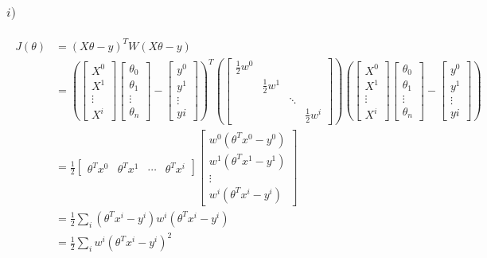\documentclass[11pt]{article}
\begin{document}
\subsubsection*{$i)$ }
\begin{align}
	\begin{split}
		J(\theta) &= (X\theta-y)^TW(X\theta-y) \\
							&= (\begin{bmatrix} X^{0} \\ X^{1} \\ \vdots \\ X^{i} \end{bmatrix}
								\begin{bmatrix} \theta_0 \\ \theta_1 \\ \vdots \\ \theta_n \end{bmatrix} -
									\begin{bmatrix} y^{0} \\ y^{1} \\ \vdots \\ y{i} \end{bmatrix})^T
								 (\begin{bmatrix} \frac{1}{2}w^{0} \\ & \frac{1}{2}w^{1} \\ & & \ddots \\ & & & \frac{1}{2}w^{i} \end{bmatrix})
								 (\begin{bmatrix} X^{0} \\ X^{1} \\ \vdots \\ X^{i} \end{bmatrix}
								  \begin{bmatrix} \theta_0 \\ \theta_1 \\ \vdots \\ \theta_n \end{bmatrix} -
									\begin{bmatrix} y^{0} \\ y^{1} \\ \vdots \\ y{i} \end{bmatrix}) \\
							&= \frac{1}{2} \begin{bmatrix} \theta^{T}x^{0} & \theta^{T}x^{1} & \cdots & \theta^{T}x^{i} \end{bmatrix} 
								 \begin{bmatrix} w^{0}(\theta^Tx^{0}-y^{0}) \\ w^{1}(\theta^Tx^{1}-y^{1}) \\ \vdots \\ w^{i}(\theta^Tx^{i}-y^{i}) \end{bmatrix} \\
							&= \frac{1}{2} \sum_i (\theta^Tx^{i}-y^{i})w^{i}(\theta^Tx^{i}-y^{i}) \\
							&= \frac{1}{2} \sum_i w^{i}(\theta^Tx^{i}-y^{i})^2
		\end{split}
\end{align}
\end{document}
